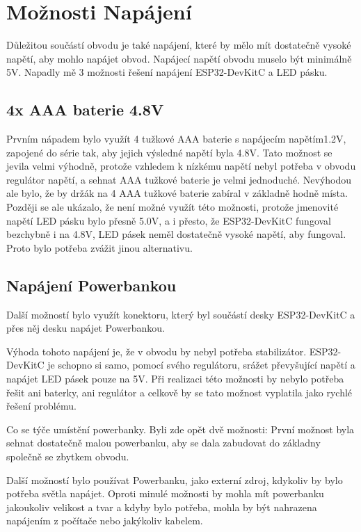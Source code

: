 \section{Možnosti Napájení}

Důležitou součástí obvodu je také napájení, které by mělo mít dostatečně vysoké napětí, aby mohlo napájet obvod. Napájecí napětí obvodu muselo být minimálně 5V. Napadly mě 3 možnosti řešení napájení ESP32-DevKitC a LED pásku.


\subsection{4x AAA baterie 4.8V}

Prvním nápadem bylo využít 4 tužkové AAA baterie s napájecím napětím1.2V, zapojené do série tak, aby jejich výsledné napětí byla 4.8V. Tato možnost se jevila velmi výhodně, protože vzhledem k nízkému napětí nebyl potřeba v obvodu regulátor napětí, a sehnat AAA tužkové baterie je velmi jednoduché. Nevýhodou ale bylo, že by držák na 4 AAA tužkové baterie zabíral v základně hodně místa.
\newpage
Později se ale ukázalo, že není možné využít této možnosti, protože jmenovité napětí LED pásku bylo přesně 5.0V, a i přesto, že ESP32-DevKitC fungoval bezchybně i na 4.8V, LED pásek neměl dostatečně vysoké napětí, aby fungoval. Proto bylo potřeba zvážit jinou alternativu.


\subsection{Napájení Powerbankou}

Další možností bylo využít konektoru, který byl součástí desky  ESP32-DevKitC a přes něj desku napájet Powerbankou.

Výhoda tohoto napájení je, že v obvodu by nebyl potřeba stabilizátor. ESP32-DevKitC je schopno si samo, pomocí svého regulátoru, srážet převyšující napětí a napájet LED pásek pouze na 5V. Při realizaci této možnosti by nebylo potřeba řešit ani baterky, ani regulátor a celkově by se tato možnost vyplatila jako rychlé řešení problému. 

Co se týče umístění powerbanky. Byli zde opět dvě možnosti: %
První možnost byla sehnat dostatečně malou powerbanku, aby se dala zabudovat do základny společně se zbytkem obvodu. 

Další možností bylo používat Powerbanku, jako externí zdroj, kdykoliv by bylo potřeba světla napájet. Oproti minulé možnosti by mohla mít powerbanku jakoukoliv velikost a tvar a kdyby bylo potřeba, mohla by být nahrazena napájením z počítače nebo jakýkoliv kabelem.  

